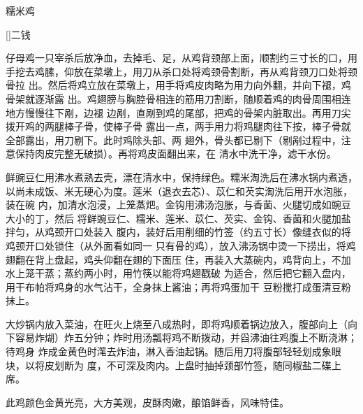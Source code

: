 \begin{recipe}[八宝糯米鸡]{糯米鸡}

\ingredients

[\footnotemark]{二钱}

\preparation

\step 仔母鸡一只宰杀后放净血，去掉毛、足，从鸡背颈部上面，顺割约三寸长的口，用
手挖去鸡膆，仰放在菜墩上，用刀从杀口处将鸡颈骨割断，再从鸡背颈刀口处将颈骨拉
出。然后将鸡立放在菜墩上，用手将鸡皮肉略为用力向外翻，并向下褪，鸡骨架就逐渐露
出。鸡翅膀与胸腔骨相连的筋用刀割断，随顺着鸡的肉骨周围相连地方慢慢往下剐，边褪
边剐，直剐到鸡的尾部，把鸡的骨架内脏取出。再用刀尖拨开鸡的两腿棒子骨，使棒子骨
露出一点，两手用力将鸡腿肉往下按，棒子骨就全部露出，用刀剔下。此时鸡除头部、两
翅外，骨头都已剔下（剔剐过程中，注意保持肉皮完整无破损）。再将鸡皮面翻出来，在
清水中洗干净，滤干水份。

\step 鲜豌豆仁用沸水煮熟去壳，漂在清水中，保持绿色。糯米淘洗后在沸水锅内煮透，
以尚未成饭、米无硬心为度。莲米（退衣去芯）、苡仁和芡实淘洗后用开水泡胀，装在碗
内，加清水泡浸，上笼蒸𤆵。金钩用沸汤泡胀，与香菌、火腿切成如豌豆大小的丁，然后
将鲜豌豆仁、糯米、莲米、苡仁、芡实、金钩、香菌和火腿加盐拌匀，从鸡颈开口处装入
腹内，装好后用削细的竹签（约五寸长）像缝衣似的将鸡颈开口处锁住（从外面看如同一
只有骨的鸡），放入沸汤锅中烫一下捞出，将鸡翅翻在背上盘起，鸡头仰翻在翅的下面压
住，再装入大蒸碗内，鸡背向上，不加水上笼干蒸；蒸约两小时，用竹筷以能将鸡翅戳破
为适合，然后把它翻入盘内，用干布帕将鸡身的水气沾干，全身抹上酱油；再将鸡蛋加干
豆粉搅打成蛋清豆粉抹上。

\step 大炒锅内放入菜油，在旺火上烧至八成热时，即将鸡顺着锅边放入，腹部向上（向
下容易炸煳）炸五分钟；炸时用汤瓢将鸡不断拨动，并舀沸油往鸡腹上不断浇淋；待鸡身
炸成金黄色时滗去炸油，淋入香油起锅。随后用刀将腹部轻轻划成象眼块，以将皮划断为
度，不可深及肉内。上盘时抽掉颈部竹签，随同椒盐二碟上席。

\features

此鸡颜色金黄光亮，大方美观，皮酥肉嫩，酿馅鲜香，风味特佳。


\end{recipe}

